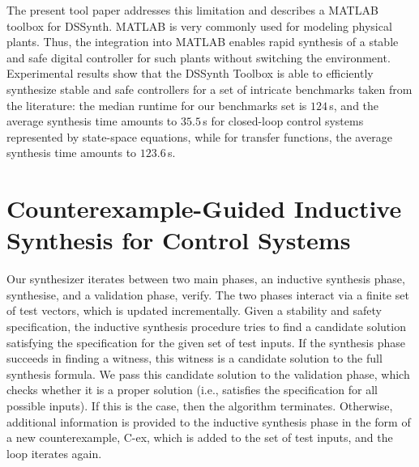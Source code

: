 \documentclass[conference]{IEEEtran}
\newcommand\tool{{DSSynth Toolbox}\xspace}
\begin{document}
The present tool paper addresses this limitation and describes a MATLAB
toolbox for DSSynth.  MATLAB is very commonly used for modeling physical
plants.  Thus, the integration into MATLAB enables rapid synthesis of a
stable and safe digital controller for such plants without switching the
environment. Experimental results show that the \tool is able to efficiently 
synthesize stable and safe controllers for a set of intricate benchmarks taken 
from the literature:  the median runtime for our benchmarks set is $124$\,s, 
and the average synthesis time amounts to $35.5$\,s for closed-loop control 
systems represented by state-space equations, while for transfer functions, 
the average synthesis time amounts to $123.6$\,s.

\section{Counterexample-Guided Inductive Synthesis for Control Systems}
\label{sec:CEGIS}



Our synthesizer iterates between two main phases, an inductive synthesis
phase, {\sc synthesise}, and a validation phase, {\sc verify}.  The two
phases interact via a finite set of test vectors, which is updated
incrementally.  Given a stability and safety specification, the inductive
synthesis procedure tries to find a candidate solution satisfying the
specification for the given set of test inputs.
%
If the synthesis phase succeeds in finding a witness, this witness is a
candidate solution to the full synthesis formula.  We pass this candidate
solution to the validation phase, which checks whether it is a proper solution
(i.e., satisfies the specification for all possible inputs).  If this is the
case, then the algorithm terminates.  Otherwise, additional information is
provided to the inductive synthesis phase in the form of a new
counterexample, C-ex, which is added to the set of test inputs, and the loop
iterates again.
\end{document}
